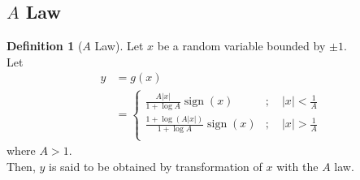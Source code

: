 \documentclass[titlepage, fleqn, a4paper, 12pt, twoside]{article}
\theoremstyle{definition}
\newtheorem{definition}{Definition}
\theoremstyle{theorem}
\DeclareMathOperator{\sign}{\mathrm{sign}}
\begin{document}
\subsection{$A$ Law}

\begin{definition}[$A$ Law]
	Let $x$ be a random variable bounded by $\pm 1$.\\
	Let
	\begin{align*}
		y &= g(x)\\
		&=
			\begin{cases}
				\frac{A |x|}{1 + \log A} \sign(x) &;\quad |x| < \frac{1}{A}\\
				\frac{1 + \log\left( A |x| \right)}{1 + \log A} \sign(x) &;\quad |x| > \frac{1}{A}\\
			\end{cases}
	\end{align*}
	where $A > 1$.\\
	Then, $y$ is said to be obtained by transformation of $x$ with the $A$ law.
	\label{def:A_law}
\end{definition}
\end{document}
